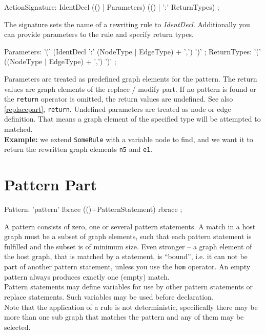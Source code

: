 \begin{rail}  
  ActionSignature: IdentDecl (() | Parameters) (() | ':' ReturnTypes) ;
\end{rail}
The signature sets the name of a rewriting rule to \emph{IdentDecl}. Additionally you can provide parameters to the rule and specify return types.

\begin{rail}
  Parameters: '(' (IdentDecl ':' (NodeType | EdgeType) + ',') ')' ;
  ReturnTypes: '(' ((NodeType | EdgeType) + ',') ')' ;
\end{rail}
Parameters are treated as predefined graph elements for the pattern. The return values are graph elements of the replace / modify part. If no pattern is found or the \texttt{return} operator is omitted, the return values are undefined. See also \ref{replacepart}, \texttt{return}. Undefined parameters are treated as node or edge definition. That means a graph element of the specified type will be attempted to matched.\\
{\small \textbf{Example:} we extend \texttt{SomeRule} with a variable node to find, and we want it to return the rewritten graph elements \texttt{n5} and \texttt{e1}.}
\begin{grgen}
  rule SomeRuleExt(varnode: Node): (Node, EdgeTypeB) {
    pattern{
      varnode;
      n1: NodeTypeA;
      ...
    }
    replace {
      varnode;
      ...  
      return(n5, e1);
      eval {
        ...
\end{grgen}

\section{Pattern Part}
\label{patternpart}
\begin{rail}
  Pattern: 'pattern' lbrace (()+PatternStatement) rbrace ;
\end{rail}
A pattern consists of zero, one or several pattern statements. A match in a host graph must be a subset of graph elements, such that each pattern statement is fulfilled and the subset is of minimum size. Even stronger -- a graph element of the host graph, that is matched by a statement, is ``bound'', i.e. it can not be part of another pattern statement, unless you use the \texttt{hom} operator. An empty pattern always produces exactly one (empty) match.\\
Pattern statements may define variables for use by other pattern statements or replace statements. Such variables may be used before declaration.\\
Note that the application of a rule is not deterministic, specifically there may be more than one sub graph that matches the pattern and any of them may be selected.

